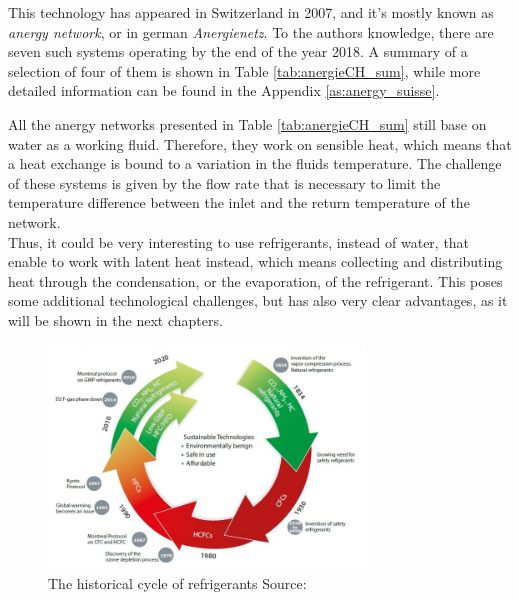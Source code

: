 \documentclass{article}
\begin{document}
This technology has appeared in Switzerland in 2007, and it's mostly known as \textit{anergy network}, or in german \textit{Anergienetz}. To the authors knowledge, there are seven such systems operating by the end of the year 2018\cite{energieschweizFallbeispieleThermischeNetze2018}. A summary of a selection of four of them is shown in Table \ref{tab:anergieCH_sum}, while more detailed information can be found in the Appendix \ref{as:anergy_suisse}.



All the anergy networks presented in Table \ref{tab:anergieCH_sum} still base on water as a working fluid. Therefore, they work on sensible heat, which means that a heat exchange is bound to a variation in the fluids temperature. The challenge of these systems is given by the flow rate that is necessary to limit the temperature difference between the inlet and the return temperature of the network.\\
Thus, it could be very interesting to use refrigerants, instead of water, that enable to work with latent heat instead, which means collecting and distributing heat through the condensation, or the evaporation, of the refrigerant. This poses some additional technological challenges, but has also very clear advantages, as it will be shown in the next chapters.\\


\begin{figure}[h!]
\centering
\includegraphics[width=0.75\textwidth]{refrigerants.JPG}
\caption{The historical cycle of refrigerants Source: \cite{danfossRefrigerantOptionsNow2017}}
\label{fig:refrigerants}
\end{figure}
\end{document}
